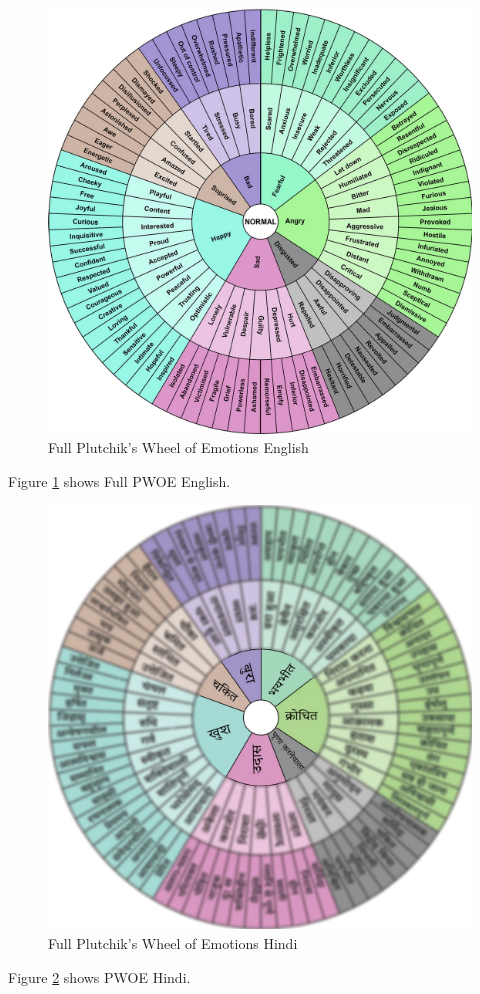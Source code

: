\begin{figure}[H]
	\includegraphics[width=\columnwidth, keepaspectratio]{PWOEEnglish}
	\caption{Full Plutchik's Wheel of Emotions English}
	\label{Fig:fig2}
\end{figure}
Figure \ref{Fig:fig2} shows  Full PWOE English.
\begin{figure}[H]
	\includegraphics[width=\columnwidth, keepaspectratio]{PWOEHindi}
	\caption{Full Plutchik's Wheel of Emotions Hindi}
	\label{Fig:fig3}
\end{figure}
Figure \ref{Fig:fig3} shows PWOE Hindi.